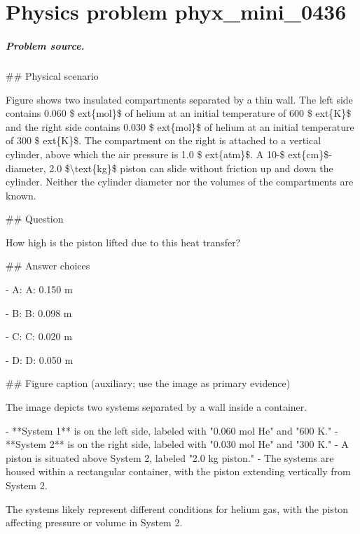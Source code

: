 
\chapter{Physics problem phyx\_mini\_0436}
\label{ch:PhyXMiniProblems_problem_phyx_mini_0436}

\paragraph{Problem source.}
\#\# Physical scenario

Figure shows two insulated compartments separated by a thin wall. The left side contains 0.060 \$	ext\{mol\}\$ of helium at an initial temperature of 600 \$	ext\{K\}\$ and the right side contains 0.030 \$	ext\{mol\}\$ of helium at an initial temperature of 300 \$	ext\{K\}\$. The compartment on the right is attached to a vertical cylinder, above which the air pressure is 1.0 \$	ext\{atm\}\$. A 10-\$	ext\{cm\}\$-diameter, 2.0 \$\textbackslash{}text\{kg\}\$ piston can slide without friction up and down the cylinder. Neither the cylinder diameter nor the volumes of the compartments are known.

\#\# Question

How high is the piston lifted due to this heat transfer?

\#\# Answer choices

- A: A: 0.150 m

- B: B: 0.098 m

- C: C: 0.020 m

- D: D: 0.050 m

\#\# Figure caption (auxiliary; use the image as primary evidence)

The image depicts two systems separated by a wall inside a container. 

- **System 1** is on the left side, labeled with "0.060 mol He" and "600 K."
- **System 2** is on the right side, labeled with "0.030 mol He" and "300 K."
- A piston is situated above System 2, labeled "2.0 kg piston."
- The systems are housed within a rectangular container, with the piston extending vertically from System 2. 

The systems likely represent different conditions for helium gas, with the piston affecting pressure or volume in System 2.


